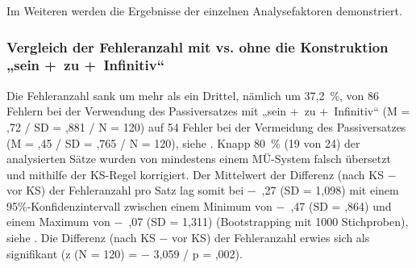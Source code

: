 
Im Weiteren werden die Ergebnisse der einzelnen Analysefaktoren demonstriert.

\subsubsection{Vergleich der Fehleranzahl mit vs. ohne die Konstruktion „sein +~zu +~Infinitiv“}
\label{sec:5.3.7.1}

Die Fehleranzahl sank um mehr als ein Drittel, nämlich um 37,2~\%, von 86 Fehlern bei der Verwendung des Passiversatzes mit „sein +~zu +~Infinitiv“ (M = ,72 / SD = ,881 / N = 120) auf 54 Fehler bei der Vermeidung des Passiversatzes (M = ,45 / SD = ,765 / N = 120), siehe . Knapp 80~\% (19 von 24) der analysierten Sätze wurden von mindestens einem MÜ-System falsch übersetzt und mithilfe der KS-Regel korrigiert. Der Mittelwert der Differenz (nach KS $-$ vor KS) der Fehleranzahl pro Satz lag somit bei $-$~,27 (SD = 1,098) mit einem 95\%\nobreakdash-Konfidenzintervall zwischen einem Minimum von $-$~,47 (SD = ,864) und einem Maximum von $-$~,07 (SD = 1,311) (Bootstrapping mit 1000 Stichproben), siehe . Die Differenz (nach KS $-$ vor KS) der Fehleranzahl erwies sich als signifikant (z (N = 120) = $-$ 3,059 / p = ,002).


